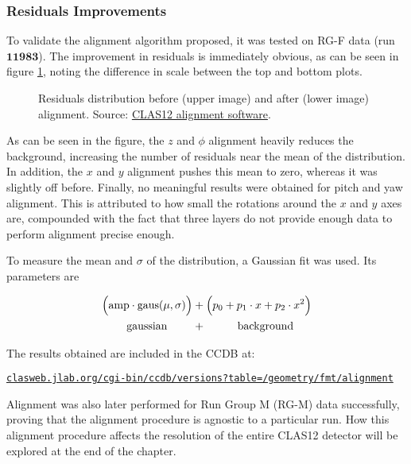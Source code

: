 \subsubsection{Residuals Improvements}
\label{sssec::residuals_improvements}
    To validate the alignment algorithm proposed, it was tested on RG-F data (run $\mathbf{11983}$).
    The improvement in residuals is immediately obvious, as can be seen in figure \ref{fig::res_comparison}, noting the difference in scale between the top and bottom plots.

    \begin{figure}[t!]
        \centering{}
        \caption[Residuals distribution improvement.]{Residuals distribution before (upper image) and after (lower image) alignment.
        Source: \hyperlink{github.com/JeffersonLab/clas12alignment}{CLAS12 alignment software}.}
        \label{fig::res_comparison}
    \end{figure}

    As can be seen in the figure, the $z$ and $\phi$ alignment heavily reduces the background, increasing the number of residuals near the mean of the distribution.
    In addition, the $x$ and $y$ alignment pushes this mean to zero, whereas it was slightly off before.
    Finally, no meaningful results were obtained for pitch and yaw alignment.
    This is attributed to how small the rotations around the $x$ and $y$ axes are, compounded with the fact that three layers do not provide enough data to perform alignment precise enough.

    To measure the mean and $\sigma$ of the distribution, a Gaussian fit was used.
    Its parameters are

     \begin{align*}
        \Big( \text{amp} \cdot \text{gaus}(\mu, \sigma) \Big) &+ \Big( p_0 + p_1\cdot x + p_2\cdot x^2 \Big) \\
        \text{gaussian} \hspace{0.8cm} &+ \hspace{1cm} \text{background}
    \end{align*}

    The results obtained are included in the CCDB at:

    \small\href{clasweb.jlab.org/cgi-bin/ccdb/versions?table=/geometry/fmt/alignment}{\texttt{clasweb.jlab.org/cgi-bin/ccdb/versions?table=/geometry/fmt/alignment}}

    Alignment was also later performed for Run Group M (RG-M) data successfully, proving that the alignment procedure is agnostic to a particular run.
    How this alignment procedure affects the resolution of the entire CLAS12 detector will be explored at the end of the chapter.
